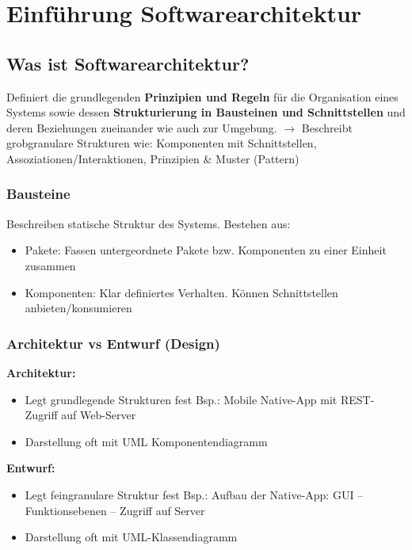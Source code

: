 

\section{Einführung Softwarearchitektur}
\subsection{Was ist Softwarearchitektur?}
Definiert die grundlegenden \textbf{Prinzipien und Regeln} für die Organisation eines Systems sowie dessen \textbf{Strukturierung in Bausteinen und Schnittstellen} und deren Beziehungen zueinander wie auch zur Umgebung. $\rightarrow$ Beschreibt grobgranulare Strukturen wie: Komponenten mit Schnittstellen, Assoziationen/Interaktionen, Prinzipien \& Muster (Pattern)

\subsubsection{Bausteine}
Beschreiben statische Struktur des Systems. Bestehen aus:
\begin{itemize}[topsep=0pt, leftmargin=3mm]
    \setlength\itemsep{-0.3em}
    \item Pakete: Fassen untergeordnete Pakete bzw. Komponenten zu einer Einheit zusammen
    \item Komponenten: Klar definiertes Verhalten. Können Schnittstellen anbieten/konsumieren
\end{itemize}

\subsubsection{Architektur vs Entwurf (Design)}
\textbf{Architektur:}
\begin{itemize}[topsep=0pt, leftmargin=3mm]
    \setlength\itemsep{-0.3em}
    \item Legt grundlegende Strukturen fest
    \SubItem Bsp.: Mobile Native-App mit REST-Zugriff auf Web-Server
    \item Darstellung oft mit UML Komponentendiagramm
\end{itemize}
\textbf{Entwurf:}
\begin{itemize}[topsep=0pt, leftmargin=3mm]
    \setlength\itemsep{-0.3em}
    \item Legt feingranulare Struktur fest
    \SubItem Bsp.: Aufbau der Native-App: GUI – Funktionsebenen – Zugriff auf Server
    \item Darstellung oft mit UML-Klassendiagramm
\end{itemize}


